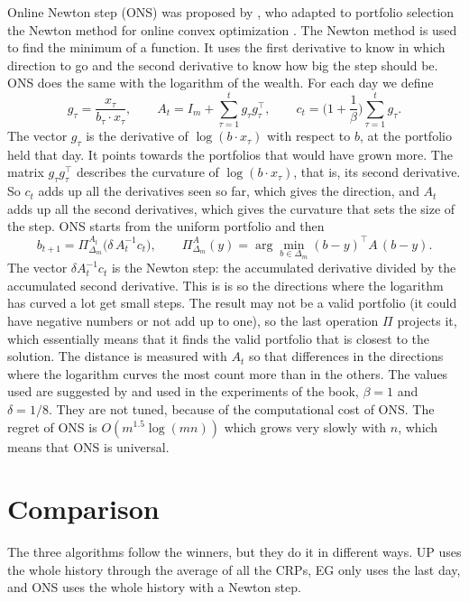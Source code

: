 Online Newton step (ONS) was proposed by \textcite{agarwal06}, who adapted to portfolio
selection the Newton method for online convex optimization \parencite{hazan07}. The
Newton method is used to find the minimum of a function. It uses the first derivative to
know in which direction to go and the second derivative to know how big the step should
be. ONS does the same with the logarithm of the wealth. For each day we define
\[
g_\tau=\frac{x_\tau}{b_\tau\cdot x_\tau},\qquad
A_t=I_m+\sum_{\tau=1}^{t}g_\tau g_\tau^\top,\qquad
c_t=\Big(1+\frac1\beta\Big)\sum_{\tau=1}^{t}g_\tau .
\]
The vector $g_\tau$ is the derivative of $\log(b\cdot x_\tau)$ with respect to $b$, at the
portfolio held that day. It points towards the portfolios that would have grown more. The 
matrix $g_\tau g_\tau^\top$ describes the curvature of $\log(b\cdot x_\tau)$, that is, its 
second derivative. So $c_t$ adds up all the derivatives seen so far, which gives the direction, 
and $A_t$ adds up all the second derivatives, which gives the curvature that sets the size of the
step. ONS starts from the uniform portfolio and then
\[
b_{t+1}=\Pi^{A_t}_{\Delta_m}\big(\delta\,A_t^{-1}c_t\big),
\qquad
\Pi^{A}_{\Delta_m}(y)=\arg\min_{b\in\Delta_m}(b-y)^\top A\,(b-y).
\]
The vector $\delta A_t^{-1}c_t$ is the Newton step: the accumulated derivative divided by
the accumulated second derivative. This is is so the directions where the logarithm has
curved a lot get small steps. The result may not be a valid portfolio (it could have
negative numbers or not add up to one), so the last operation $\Pi$ projects it, which
essentially means that it finds the valid portfolio that is closest to the solution. 
The distance is measured with $A_t$ so that differences in the directions where the logarithm 
curves the most count more than in the others. The values used are suggested by \textcite{agarwal06}
and used in the experiments of the book, $\beta=1$ and $\delta=1/8$. They are not tuned, because 
of the computational cost of ONS. The regret of ONS is $O(m^{1.5}\log(mn))$ \parencite{agarwal06} 
which grows very slowly with $n$, which means that ONS is universal.

\section{Comparison}

The three algorithms follow the winners, but they do it in different ways. UP uses the
whole history through the average of all the CRPs, EG only uses the last day, and ONS uses
the whole history with a Newton step.

